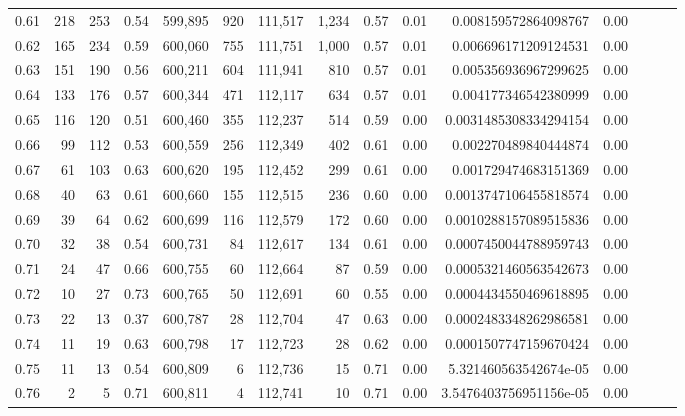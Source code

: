 \begin{tabular}{rrrrrrrrrrrrrrr}
0.61 &     218 &    253 &  0.54 &  599,895 &      920 &  111,517 &    1,234 &  0.57 &  0.01 &    0.008159572864098767 &      0.00 \\
0.62 &     165 &    234 &  0.59 &  600,060 &      755 &  111,751 &    1,000 &  0.57 &  0.01 &    0.006696171209124531 &      0.00 \\
0.63 &     151 &    190 &  0.56 &  600,211 &      604 &  111,941 &      810 &  0.57 &  0.01 &    0.005356936967299625 &      0.00 \\
0.64 &     133 &    176 &  0.57 &  600,344 &      471 &  112,117 &      634 &  0.57 &  0.01 &    0.004177346542380999 &      0.00 \\
0.65 &     116 &    120 &  0.51 &  600,460 &      355 &  112,237 &      514 &  0.59 &  0.00 &   0.0031485308334294154 &      0.00 \\
0.66 &      99 &    112 &  0.53 &  600,559 &      256 &  112,349 &      402 &  0.61 &  0.00 &    0.002270489840444874 &      0.00 \\
0.67 &      61 &    103 &  0.63 &  600,620 &      195 &  112,452 &      299 &  0.61 &  0.00 &    0.001729474683151369 &      0.00 \\
0.68 &      40 &     63 &  0.61 &  600,660 &      155 &  112,515 &      236 &  0.60 &  0.00 &   0.0013747106455818574 &      0.00 \\
0.69 &      39 &     64 &  0.62 &  600,699 &      116 &  112,579 &      172 &  0.60 &  0.00 &   0.0010288157089515836 &      0.00 \\
0.70 &      32 &     38 &  0.54 &  600,731 &       84 &  112,617 &      134 &  0.61 &  0.00 &   0.0007450044788959743 &      0.00 \\
0.71 &      24 &     47 &  0.66 &  600,755 &       60 &  112,664 &       87 &  0.59 &  0.00 &   0.0005321460563542673 &      0.00 \\
0.72 &      10 &     27 &  0.73 &  600,765 &       50 &  112,691 &       60 &  0.55 &  0.00 &   0.0004434550469618895 &      0.00 \\
0.73 &      22 &     13 &  0.37 &  600,787 &       28 &  112,704 &       47 &  0.63 &  0.00 &   0.0002483348262986581 &      0.00 \\
0.74 &      11 &     19 &  0.63 &  600,798 &       17 &  112,723 &       28 &  0.62 &  0.00 &   0.0001507747159670424 &      0.00 \\
0.75 &      11 &     13 &  0.54 &  600,809 &        6 &  112,736 &       15 &  0.71 &  0.00 &   5.321460563542674e-05 &      0.00 \\
0.76 &       2 &      5 &  0.71 &  600,811 &        4 &  112,741 &       10 &  0.71 &  0.00 &  3.5476403756951156e-05 &      0.00 \\

\end{tabular}
